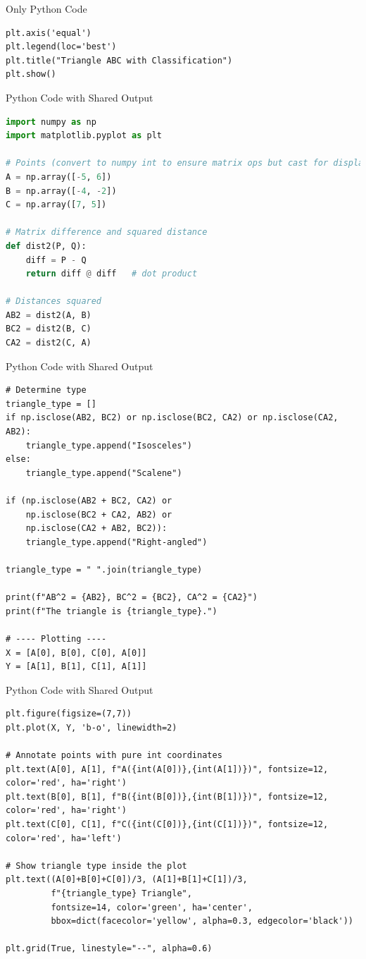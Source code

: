 \documentclass{beamer}
\begin{document}
\begin{frame}[fragile]{Only Python Code}
\begin{lstlisting}
plt.axis('equal')
plt.legend(loc='best')
plt.title("Triangle ABC with Classification")
plt.show()
\end{lstlisting}
\end{frame}

\begin{frame}[fragile]{Python Code with Shared Output}
\begin{lstlisting}[language=Python]
import numpy as np
import matplotlib.pyplot as plt

# Points (convert to numpy int to ensure matrix ops but cast for display)
A = np.array([-5, 6])
B = np.array([-4, -2])
C = np.array([7, 5])

# Matrix difference and squared distance
def dist2(P, Q):
    diff = P - Q
    return diff @ diff   # dot product

# Distances squared
AB2 = dist2(A, B)
BC2 = dist2(B, C)
CA2 = dist2(C, A)
\end{lstlisting}
\end{frame}
\begin{frame}[fragile]{Python Code with Shared Output}
\begin{lstlisting}
# Determine type
triangle_type = []
if np.isclose(AB2, BC2) or np.isclose(BC2, CA2) or np.isclose(CA2, AB2):
    triangle_type.append("Isosceles")
else:
    triangle_type.append("Scalene")

if (np.isclose(AB2 + BC2, CA2) or 
    np.isclose(BC2 + CA2, AB2) or 
    np.isclose(CA2 + AB2, BC2)):
    triangle_type.append("Right-angled")

triangle_type = " ".join(triangle_type)

print(f"AB^2 = {AB2}, BC^2 = {BC2}, CA^2 = {CA2}")
print(f"The triangle is {triangle_type}.")

# ---- Plotting ----
X = [A[0], B[0], C[0], A[0]]
Y = [A[1], B[1], C[1], A[1]]
\end{lstlisting}
\end{frame}
\begin{frame}[fragile]{Python Code with Shared Output}
\begin{lstlisting}
plt.figure(figsize=(7,7))
plt.plot(X, Y, 'b-o', linewidth=2)

# Annotate points with pure int coordinates
plt.text(A[0], A[1], f"A({int(A[0])},{int(A[1])})", fontsize=12, color='red', ha='right')
plt.text(B[0], B[1], f"B({int(B[0])},{int(B[1])})", fontsize=12, color='red', ha='right')
plt.text(C[0], C[1], f"C({int(C[0])},{int(C[1])})", fontsize=12, color='red', ha='left')

# Show triangle type inside the plot
plt.text((A[0]+B[0]+C[0])/3, (A[1]+B[1]+C[1])/3, 
         f"{triangle_type} Triangle", 
         fontsize=14, color='green', ha='center', 
         bbox=dict(facecolor='yellow', alpha=0.3, edgecolor='black'))

plt.grid(True, linestyle="--", alpha=0.6)
\end{lstlisting}
\end{frame}
\end{document}
